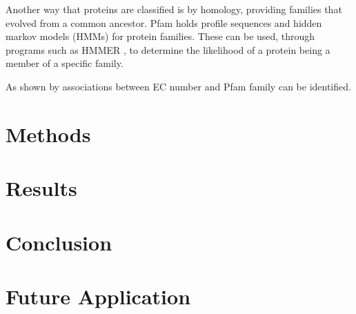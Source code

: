 \documentclass{report}
\begin{document}
		Another way that proteins are classified is by homology, providing families that evolved from a common ancestor.  Pfam \citep{RefWorks:doc:5d6e641de4b0a51fb0eed90f} holds profile sequences and hidden markov models (HMMs) for protein families. These can be used, through programs such as HMMER \citep{RefWorks:doc:5c8f77ece4b077fbbf563f6a}, to determine the likelihood of a protein being a member of a specific family.%
		
		As shown by \citep{RefWorks:doc:5d6f9c26e4b0ec3eed182252} associations between EC number and Pfam family can be identified.  %
		
		
		
		
	\section{Methods}
		
		
		
	\section{Results}
		
		
				
	\section{Conclusion}
		
		
		
	\section{Future Application}
		
		
		
\pagebreak

	{}
	
\end{document}
